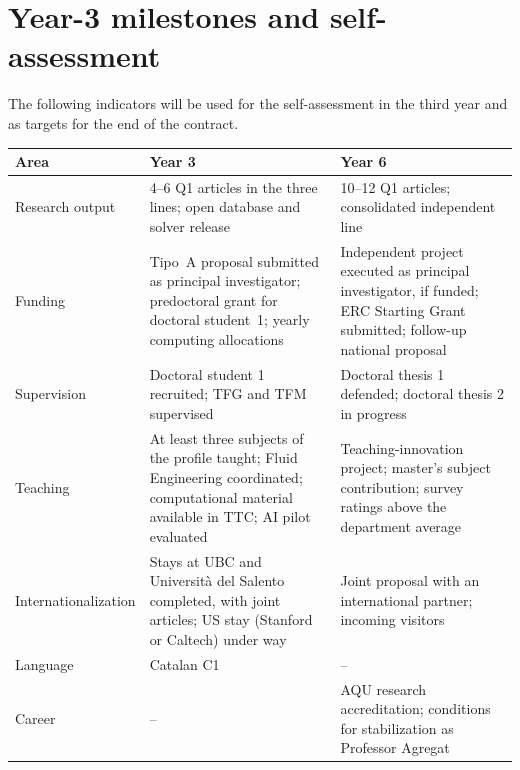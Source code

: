 \documentclass[11pt]{article}
\begin{document}
\section{Year-3 milestones and self-assessment}
The following indicators will be used for the self-assessment in the third year and as
targets for the end of the contract.
\begin{center}\small
\begin{tabularx}{\textwidth}{@{}p{3.0cm}XX@{}}
\toprule
\textbf{Area} & \textbf{Year 3} & \textbf{Year 6} \\
\midrule
Research output & 4--6 Q1 articles in the three lines; open database and solver release & 10--12 Q1 articles; consolidated independent line \\
Funding & Tipo~A proposal submitted as principal investigator; predoctoral grant for doctoral student~1; yearly computing allocations & Independent project executed as principal investigator, if funded; ERC Starting Grant submitted; follow-up national proposal \\
Supervision & Doctoral student 1 recruited; TFG and TFM supervised & Doctoral thesis 1 defended; doctoral thesis 2 in progress \\
Teaching & At least three subjects of the profile taught; Fluid Engineering coordinated; computational material available in TTC; AI pilot evaluated & Teaching-innovation project; master's subject contribution; survey ratings above the department average \\
Internationalization & Stays at UBC and Universit\`a del Salento completed, with joint articles; US stay (Stanford or Caltech) under way & Joint proposal with an international partner; incoming visitors \\
Language & Catalan C1 & -- \\
Career & -- & AQU research accreditation; conditions for stabilization as Professor Agregat \\
\bottomrule
\end{tabularx}
\end{center}
\end{document}
